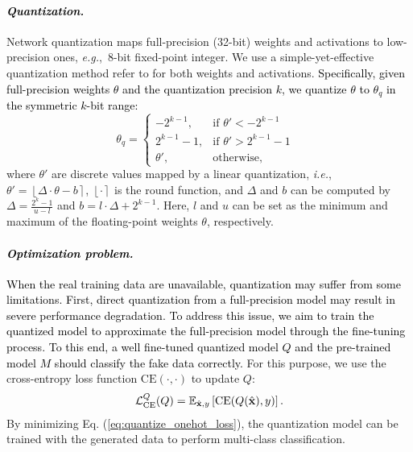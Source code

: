 \documentclass[runningheads]{llncs}
\def\eg{\emph{e.g}\onedot}
\def\ie{\emph{i.e}\onedot}
\def\ie{\mbox{\textit{i.e.}, }}
\def\eg{\mbox{\textit{e.g.}, }}
\def\CE{\text{CE}}
\def\onehot{\mathrm{CE}}
\def\mL{{\mathcal L}}
\def\bx{{\bf x}}
\def\mmE{{\mathbb E}}
\def\bx{{\bf x}}
\def\xsk{\textcolor{black}}
\def\jie{\textcolor{black}}
\def\wrong{\textcolor{black}}
\def\new{\textcolor{black}}
\begin{document}
\paragraph{\textbf{\emph{\jie{Quantization.}}}}

Network quantization maps full-precision (32-bit) weights and activations to low-precision ones, \eg 8-bit fixed-point integer. 
We use a simple-yet-effective quantization method refer to \cite{jacob2018quantization} for both weights and activations.
\xsk{Specifically, given full-precision weights ${\theta}$ and the quantization precision $k$, we quantize ${\theta}$ to ${\theta_q}$ in the symmetric $k$-bit range:}
\begin{equation}
\label{eq:clip}
\theta_{q} = 
\begin{cases}
    -2^{k-1},  &\text{if $\theta' {<} -2^{k-1}$ }\\
    2^{k-1}{-}1, &\text{if $\theta' {>} 2^{k-1}{-}1$ }\\
    \theta', &\text{otherwise},
    \end{cases}
\end{equation}
where $\theta'$ are discrete values mapped by a linear quantization, \ie $\theta' =\left\lfloor\Delta \cdot {\theta} - b\right\rceil$,
$\left\lfloor \cdot \right\rceil$ is the round function,
and $\Delta$ and $b$ can be computed by
$\Delta=\frac{2^{k}-1}{u-l} $ and $ b = l \cdot \Delta + 2^{k-1}$.
Here, $l$ and $u$ can be set as the minimum and maximum of the floating-point weights $\theta$, respectively.


\paragraph{\emph{\textbf{\wrong{Optimization problem.}}}}
\jie{
When the real training data are unavailable, quantization may suffer from some limitations.
First, \new{direct quantization} from a full-precision model may result in severe performance degradation.
To address this issue, we aim to train the quantized model to approximate the full-precision model through the fine-tuning process.
To this end, a well fine-tuned quantized model $Q$ and the pre-trained model $M$ should classify the fake data correctly.
}
For this purpose, we use the cross-entropy loss function $\CE(\cdot,\cdot)$ to update $Q$:
\begin{eqnarray}\label{eq:quantize_onehot_loss}
\mL^Q_\onehot(Q)=\mmE_{\hat{\bx}, y}\left[\CE(Q({\hat{\bx}}), y)\right].
\end{eqnarray}
By minimizing Eq. (\ref{eq:quantize_onehot_loss}), the quantization model can be trained with the generated data to perform multi-class classification.
\end{document}
